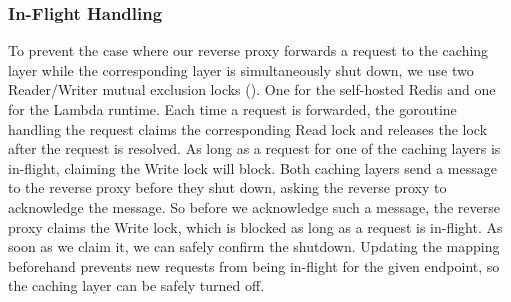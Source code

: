 \subsubsection{In-Flight Handling} 
To prevent the case where our reverse proxy forwards a request to the caching layer while the corresponding layer is simultaneously shut down, we use two Reader/Writer mutual exclusion locks (). One for the self-hosted Redis and one for the Lambda runtime. Each time a request is forwarded, the goroutine handling the request claims the corresponding Read lock and releases the lock after the request is resolved. As long as a request for one of the caching layers is in-flight, claiming the Write lock will block. Both caching layers send a message to the reverse proxy before they shut down, asking the reverse proxy to acknowledge the message. So before we acknowledge such a message, the reverse proxy claims the Write lock, which is blocked as long as a request is in-flight. As soon as we claim it, we can safely confirm the shutdown. Updating the mapping beforehand prevents new requests from being in-flight for the given endpoint, so the caching layer can be safely turned off.

